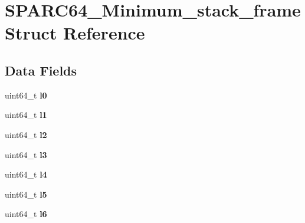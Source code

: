 \hypertarget{structSPARC64__Minimum__stack__frame}{}\section{S\+P\+A\+R\+C64\+\_\+\+Minimum\+\_\+stack\+\_\+frame Struct Reference}
\label{structSPARC64__Minimum__stack__frame}
\subsection*{Data Fields}
\begin{DoxyCompactItemize}
\item 
\mbox{\label{structSPARC64__Minimum__stack__frame_a601babbafac4bd83fd8cda650ca6728c}} 
uint64\+\_\+t {\bfseries l0}
\item 
\mbox{\label{structSPARC64__Minimum__stack__frame_a61457039af567904ec82c123d39d75ad}} 
uint64\+\_\+t {\bfseries l1}
\item 
\mbox{\label{structSPARC64__Minimum__stack__frame_acc1208a3df7ed396336c53a4630a9e8e}} 
uint64\+\_\+t {\bfseries l2}
\item 
\mbox{\label{structSPARC64__Minimum__stack__frame_a35af3d301f843a0c855668c7f4df35e9}} 
uint64\+\_\+t {\bfseries l3}
\item 
\mbox{\label{structSPARC64__Minimum__stack__frame_a25a3c50a1f39b8ecb231910b1cb2a593}} 
uint64\+\_\+t {\bfseries l4}
\item 
\mbox{\label{structSPARC64__Minimum__stack__frame_a73b713b72db83ca92ca94cb1185a4668}} 
uint64\+\_\+t {\bfseries l5}
\item 
\mbox{\label{structSPARC64__Minimum__stack__frame_afa7edc3acaa7c3a55907aac910f79dff}} 
uint64\+\_\+t {\bfseries l6}
\item 
\mbox{\label{structSPARC64__Minimum__stack__frame_a28d91e1f74e92a4867c01f3fb5041403}} 

\end{DoxyCompactItemize}
